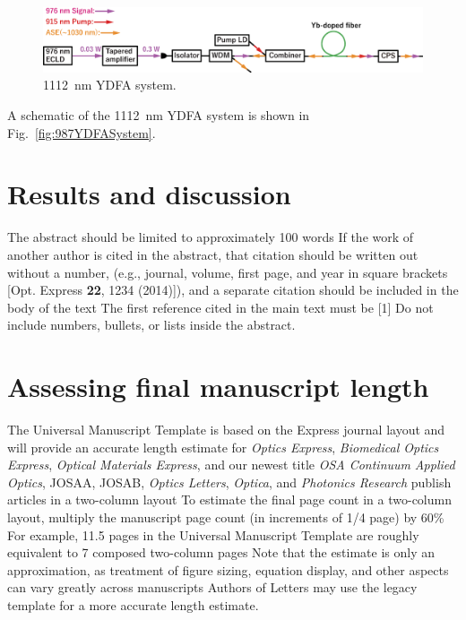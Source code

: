 \documentclass{osa-article}
\begin{document}
\begin{figure}[h!]
\centering\includegraphics[width=\linewidth]{./Figure/976nmYDFASystem.eps}
\caption{\SI{1112}{nm} YDFA system.}
\label{fig:1112YDFASystem}
\end{figure}

A schematic of the \SI{1112}{nm} YDFA system is shown in Fig.~\ref{fig:987YDFASystem}.



\section{Results and discussion}
The abstract should be limited to approximately 100 words
If the work of another author is cited in the abstract, that citation should be written out without a number, (e.g., journal, volume, first page, and year in square brackets [Opt. Express {\bfseries 22}, 1234 (2014)]), and a separate citation should be included in the body of the text
The first reference cited in the main text must be [1]
Do not include numbers, bullets, or lists inside the abstract.




\section{Assessing final manuscript length}
The Universal Manuscript Template is based on the Express journal layout and will provide an accurate length estimate for \emph{Optics Express}, \emph{Biomedical Optics Express},  \emph{Optical Materials Express}, and our newest title \emph{OSA Continuum}
\emph{Applied Optics}, JOSAA, JOSAB, \emph{Optics Letters}, \emph{Optica}, and \emph{Photonics Research} publish articles in a two-column layout
To estimate the final page count in a two-column layout, multiply the manuscript page count (in increments of 1/4 page) by 60\%
For example, 11.5 pages in the Universal Manuscript Template are roughly equivalent to 7 composed two-column pages
Note that the estimate is only an approximation, as treatment of figure sizing, equation display, and other aspects can vary greatly across manuscripts
Authors of Letters may use the legacy template for a more accurate length estimate.
\end{document}
